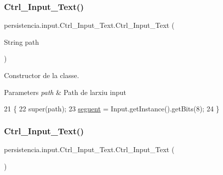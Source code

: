 \subsubsection{\texorpdfstring{Ctrl\+\_\+\+Input\+\_\+\+Text()}{Ctrl\_Input\_Text()}\hspace{0.1cm}{\footnotesize\ttfamily [1/2]}}
{\footnotesize\ttfamily persistencia.\+input.\+Ctrl\+\_\+\+Input\+\_\+\+Text.\+Ctrl\+\_\+\+Input\+\_\+\+Text (\begin{DoxyParamCaption}\item[{String}]{path }\end{DoxyParamCaption})\hspace{0.3cm}{\ttfamily [inline]}}



Constructor de la classe. 


\begin{DoxyParams}{Parameters}
{\em path} & Path de l\textquotesingle{}arxiu input \\
\hline
\end{DoxyParams}

\begin{DoxyCode}
21                                         \{
22         super(path);
23         \hyperlink{classpersistencia_1_1input_1_1Ctrl__Input__Text_a533e9e0497774114b57d8dd5a6bbb000}{seguent} = Input.getInstance().getBits(8);
24     \}
\end{DoxyCode}
\mbox{\label{classpersistencia_1_1input_1_1Ctrl__Input__Text_a91bc7bb52bcc996d89134892d5b48523}} 
\subsubsection{\texorpdfstring{Ctrl\+\_\+\+Input\+\_\+\+Text()}{Ctrl\_Input\_Text()}\hspace{0.1cm}{\footnotesize\ttfamily [2/2]}}
{\footnotesize\ttfamily persistencia.\+input.\+Ctrl\+\_\+\+Input\+\_\+\+Text.\+Ctrl\+\_\+\+Input\+\_\+\+Text (\begin{DoxyParamCaption}{ }\end{DoxyParamCaption})\hspace{0.3cm}{\ttfamily [inline]}}



